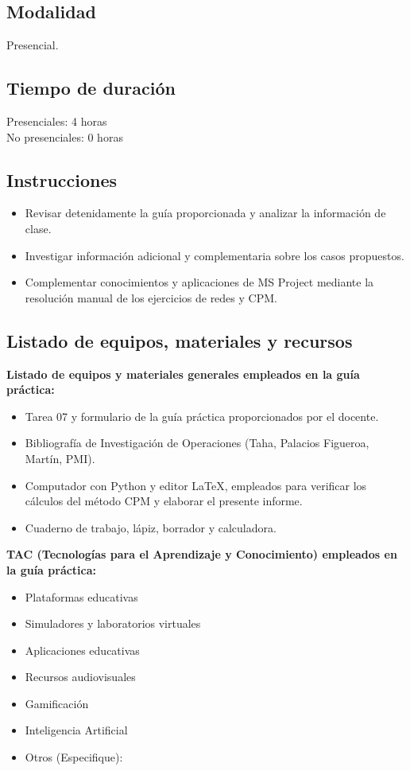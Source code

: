 \documentclass{article}
\begin{document}
\subsection{Modalidad}
Presencial.

\subsection{Tiempo de duración}

Presenciales: 4 horas\\
No presenciales: 0 horas

\subsection{Instrucciones}

\begin{itemize}
    \item Revisar detenidamente la guía proporcionada y analizar la información de clase.
    \item Investigar información adicional y complementaria sobre los casos propuestos.
    \item Complementar conocimientos y aplicaciones de MS Project mediante la resolución manual de los ejercicios de redes y CPM.
\end{itemize}

\subsection{Listado de equipos, materiales y recursos}
\textbf{Listado de equipos y materiales generales empleados en la guía práctica:}
\begin{itemize}
    \item Tarea 07 y formulario de la guía práctica proporcionados por el docente.
    \item Bibliografía de Investigación de Operaciones (Taha, Palacios Figueroa, Martín, PMI).
    \item Computador con Python y editor LaTeX, empleados para verificar los cálculos del método CPM y elaborar el presente informe.
    \item Cuaderno de trabajo, lápiz, borrador y calculadora.
\end{itemize}

\textbf{TAC (Tecnologías para el Aprendizaje y Conocimiento) empleados en la guía práctica:}
\begin{itemize}
    \item[$\square$] Plataformas educativas
    \item[$\square$] Simuladores y laboratorios virtuales
    \item[$\square$] Aplicaciones educativas
    \item[$\square$] Recursos audiovisuales
    \item[$\square$] Gamificación
    \item[$\boxtimes$] Inteligencia Artificial
    \item Otros (Especifique): \underline{\hspace{5cm}}
\end{itemize}
\end{document}
